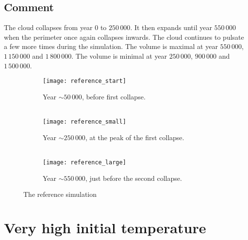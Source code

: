 \documentclass[../main.tex]{subfiles}
\begin{document}
\subsection{Comment}
The cloud collapses from year $0$ to $250 \, 000$. It then expands until year $550 \, 000$ when the
perimeter once again collapses inwards. The cloud continues to pulsate a few more times during the
simulation. The volume is maximal at year $550 \, 000$, $1 \, 150 \, 000$ and $1 \, 800 \, 000$. The
volume is minimal at year $250 \, 000$, $900 \, 000$ and $1 \, 500 \, 000$.

\begin{figure}[p]
  \centering
  \begin{subfigure}[b]{0.495\linewidth}
    \texttt{[image: reference\_start]}
    \caption{Year $\sim 50 \, 000$, before first collapse.\\\ }
  \end{subfigure}
  \begin{subfigure}[b]{0.495\linewidth}
    \texttt{[image: reference\_small]}
    \caption{Year $\sim 250 \, 000$, at the peak of the first collapse.\\\ }
  \end{subfigure}
  \begin{subfigure}[b]{0.495\linewidth}
    \texttt{[image: reference\_large]}
    \caption{Year $\sim 550 \, 000$, just before the second collapse.}
  \end{subfigure}
  \caption{The reference simulation}
  \label{fig:coffee}
\end{figure}
\restoregeometry

\section{Very high initial temperature}
\end{document}
